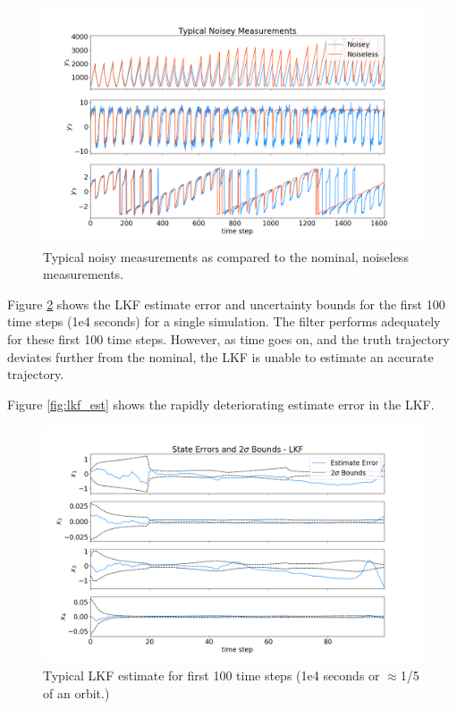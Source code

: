\documentclass[11pt, a4paper]{article}
\begin{document}
\begin{figure}[H]
	\centering
	\includegraphics[width=\textwidth]{Figures/noisey_meas.png}
	\caption{Typical noisy measurements as compared to the nominal, noiseless measurements.}
	\label{fig:noisey_meas}
\end{figure}

Figure \ref{fig:lkf_est_zoom} shows the LKF estimate error and uncertainty bounds for the first 100 time steps (1e4 seconds) for a single simulation. 
The filter performs adequately for these first 100 time steps.
However, as time goes on, and the truth trajectory deviates further from the nominal, the LKF is unable to estimate an accurate trajectory.

Figure \ref{fig:lkf_est} shows the rapidly deteriorating estimate error in the LKF.  

\begin{figure}[H]
	\centering
	\includegraphics[width=\textwidth]{Figures/lkf_estimate_th_ZOOM.png}
	\caption{Typical LKF estimate for first 100 time steps (1e4 seconds or $\approx$1/5 of an orbit.)}
	\label{fig:lkf_est_zoom}
\end{figure}
\end{document}
